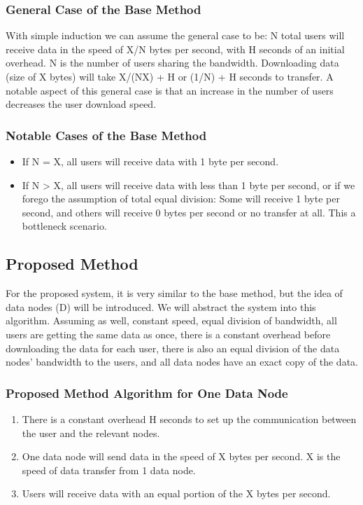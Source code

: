 \documentclass[acmsmall]{acmart}
\begin{document}
\begin{multicols}{2}
\subsubsection{General Case of the Base Method} 
With simple induction we can assume the general case to be: N total users will receive data in the speed of X/N bytes per second, with H seconds of an initial overhead. N is the number of users sharing the bandwidth. Downloading data (size of X bytes) will take X/(NX) + H or (1/N) + H seconds to transfer. A notable aspect of this general case is that an increase in the number of users decreases the user download speed.

\subsubsection{Notable Cases of the Base Method}
    \begin{itemize} 
        \item If N = X, all users will receive data with 1 byte per second.
        \item If N > X, all users will receive data with less than 1 byte per second, or if we forego the assumption of total equal division: Some will receive 1 byte per second, and others will receive 0 bytes per second or no transfer at all. This a bottleneck scenario.
    \end{itemize}

\subsection{Proposed Method}
For the proposed system, it is very similar to the base method, but the idea of data nodes (D) will be introduced. We will abstract the system into this algorithm. Assuming as well, constant speed, equal division of bandwidth, all users are getting the same data as once, there is a constant overhead before downloading the data for each user, there is also an equal division of the data nodes' bandwidth to the users, and all data nodes have an exact copy of the data.

\subsubsection{Proposed Method Algorithm for One Data Node}

\begin{enumerate}
    \item There is a constant overhead H seconds to set up the communication between the user and the relevant nodes.
    \item One data node will send data in the speed of X bytes per second. X is the speed of data transfer from 1 data node.
    \item Users will receive data with an equal portion of the X bytes per second. 
\end{enumerate}


\end{multicols}
\end{document}
